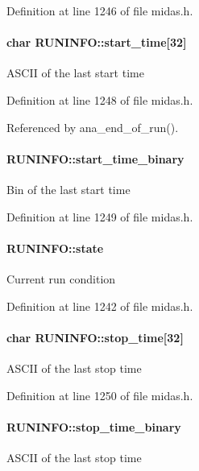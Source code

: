 Definition at line 1246 of file midas.h.
\paragraph[{start\_\-time}]{\setlength{\rightskip}{0pt plus 5cm}char {\bf RUNINFO::start\_\-time}\mbox{[}32\mbox{]}}\hfill\label{structRUNINFO_a11fb9fb218581c46a448aa9fd3531b68}
ASCII of the last start time 

Definition at line 1248 of file midas.h.

Referenced by ana\_\-end\_\-of\_\-run().
\paragraph[{start\_\-time\_\-binary}]{ {\bf RUNINFO::start\_\-time\_\-binary}}\hfill\label{structRUNINFO_a495a2887a420437a45c0a602758fcf34}
Bin of the last start time 

Definition at line 1249 of file midas.h.
\paragraph[{state}]{ {\bf RUNINFO::state}}\hfill\label{structRUNINFO_a7c400fc343d96a490a32bc64fca7be05}
Current run condition 

Definition at line 1242 of file midas.h.
\paragraph[{stop\_\-time}]{\setlength{\rightskip}{0pt plus 5cm}char {\bf RUNINFO::stop\_\-time}\mbox{[}32\mbox{]}}\hfill\label{structRUNINFO_a3c0b44aedcf1670b74c1516f6702ee9f}
ASCII of the last stop time 

Definition at line 1250 of file midas.h.
\paragraph[{stop\_\-time\_\-binary}]{ {\bf RUNINFO::stop\_\-time\_\-binary}}\hfill\label{structRUNINFO_a8561e123308cba90d8a024eb9f205052}
ASCII of the last stop time 

